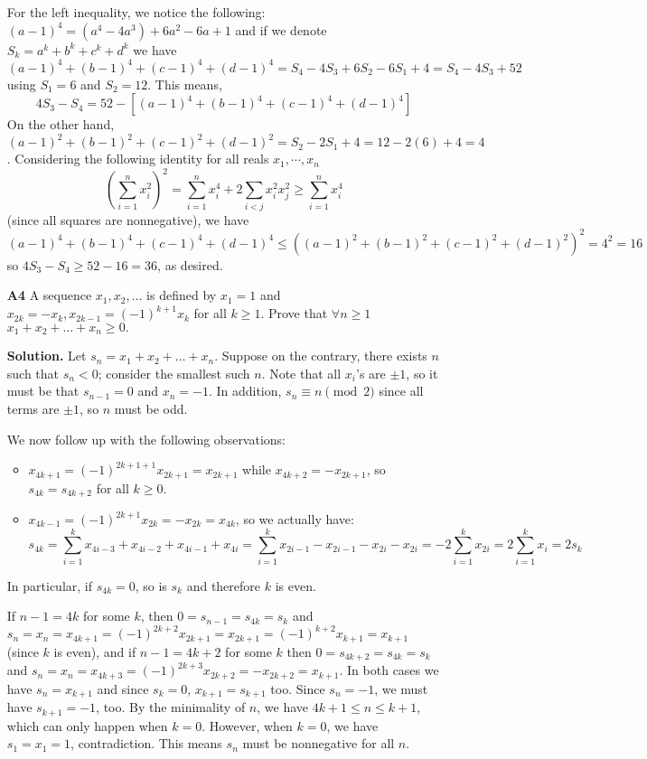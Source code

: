 \documentclass[11pt]{article}
\newcommand{\<}{\langle}
\renewcommand{\>}{\rangle}
\begin{document}
\begin{enumerate}
	For the left inequality, we notice the following: $(a-1)^4=(a^4-4a^3)+6a^2-6a+1$ and if we denote $S_k=a^k+b^k+c^k+d^k$ we have
	\begin{equation}
		(a-1)^4+(b-1)^4+(c-1)^4+(d-1)^4=S_4-4S_3+6S_2-6S_1+4=S_4-4S_3+52
	\end{equation}
	using $S_1=6$ and $S_2=12$. 
	This means, \[4S_3-S_4=52-\left[(a-1)^4+(b-1)^4+(c-1)^4+(d-1)^4\right]\]
	On the other hand, 
	$(a-1)^2+(b-1)^2+(c-1)^2+(d-1)^2=S_2-2S_1+4=12-2(6)+4=4$. Considering the following identity for all reals $x_1, \cdots , x_n$
	\[
	\left(\displaystyle\sum_{i=1}^n x_i^2\right)^2
	=\displaystyle\sum_{i=1}^n x_i^4 + 2\displaystyle\sum_{i < j} x_i^2x_j^2
	\ge \displaystyle\sum_{i=1}^n x_i^4
	\]
	(since all squares are nonnegative), we have 
	\[(a-1)^4+(b-1)^4+(c-1)^4+(d-1)^4\le ((a-1)^2+(b-1)^2+(c-1)^2+(d-1)^2)^2=4^2=16\] so $4S_3-S_4\ge 52-16=36$, as desired. 
	
	\item[\textbf{A4}] A sequence $x_1, x_2, \ldots$ is defined by $x_1 = 1$ and $x_{2k}=-x_k, x_{2k-1} = (-1)^{k+1}x_k$ for all $k \geq 1.$ Prove that $\forall n \geq 1$ $x_1 + x_2 + \ldots + x_n \geq 0.$
	
	\textbf{Solution.} Let $s_n=x_1 + x_2 + \ldots + x_n$. Suppose on the contrary, there exists $n$ such that $s_n<0$; 
	consider the smallest such $n$. Note that all $x_i$'s are $\pm 1$, so it must be that $s_{n-1}=0$ and $x_n=-1$. In addition, $s_n\equiv n\pmod{2}$ since all terms are $\pm 1$, so $n$ must be odd. 
	
	We now follow up with the following observations: 
	\begin{itemize}
		\item $x_{4k+1}=(-1)^{2k+1+1}x_{2k+1}=x_{2k+1}$ while $x_{4k+2}=-x_{2k+1}$, so $s_{4k}=s_{4k+2}$ for all $k\ge 0$. 
		
		\item $x_{4k-1}=(-1)^{2k+1}x_{2k}=-x_{2k}=x_{4k}$, so we actually have: 
		\[
		s_{4k}=\displaystyle\sum_{i=1}^k x_{4i-3}+x_{4i-2}+x_{4i-1}+x_{4i}
		=\displaystyle\sum_{i=1}^k x_{2i-1}-x_{2i-1}-x_{2i}-x_{2i}
		=-2\displaystyle\sum_{i=1}^k x_{2i}
		=2\displaystyle\sum_{i=1}^k x_{i}
		=2s_k
		\]
	\end{itemize}
	In particular, if $s_{4k}=0$, so is $s_k$ and therefore $k$ is even. 
	
	If $n-1=4k$ for some $k$, then $0=s_{n-1}=s_{4k}=s_k$ and $s_n=x_n=x_{4k+1}=(-1)^{2k+2}x_{2k+1}=x_{2k+1}=(-1)^{k+2}x_{k+1}=x_{k+1}$ (since $k$ is even), and if $n-1=4k+2$ for some $k$ then $0=s_{4k+2}=s_{4k}=s_k$ and 
	$s_n=x_n=x_{4k+3}=(-1)^{2k+3}x_{2k+2}=-x_{2k+2}=x_{k+1}$. 
	In both cases we have $s_n=x_{k+1}$ and since $s_k=0$, $x_{k+1}=s_{k+1}$ too. Since $s_n=-1$, we must have $s_{k+1}=-1$, too. 
	By the minimality of $n$, we have $4k+1\le n\le k+1$, which can only happen when $k=0$. However, when $k=0$, we have $s_1=x_1=1$, contradiction. This means $s_n$ must be nonnegative for all $n$. 
	

\end{enumerate}
\end{document}

